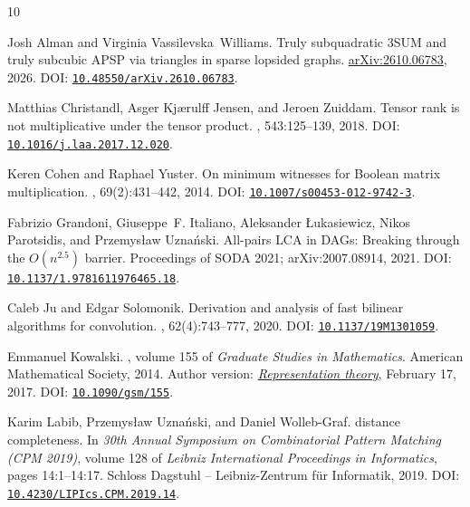 \documentclass[11pt]{article}
\newcommand{\doi}[1]{\href{https://doi.org/#1}{\nolinkurl{#1}}}
\begin{document}
\begin{thebibliography}{10}
\raggedright

Josh Alman and Virginia Vassilevska~Williams.
\newblock Truly subquadratic {3SUM} and truly subcubic {APSP} via triangles in
  sparse lopsided graphs.
\newblock \href{https://arxiv.org/abs/2610.06783}{arXiv:2610.06783}, 2026.
\newblock DOI: \doi{10.48550/arXiv.2610.06783}.

Matthias Christandl, Asger Kj{\ae}rulff Jensen, and Jeroen Zuiddam.
\newblock Tensor rank is not multiplicative under the tensor product.
, 543:125--139, 2018.
\newblock DOI: \doi{10.1016/j.laa.2017.12.020}.

Keren Cohen and Raphael Yuster.
\newblock On minimum witnesses for {Boolean} matrix multiplication.
, 69(2):431--442, 2014.
\newblock DOI: \doi{10.1007/s00453-012-9742-3}.

Fabrizio Grandoni, Giuseppe~F. Italiano, Aleksander {\L}ukasiewicz, Nikos
  Parotsidis, and Przemys{\l}aw Uzna\'{n}ski.
\newblock All-pairs {LCA} in {DAGs}: Breaking through the {$O(n^{2.5})$}
  barrier.
\newblock Proceedings of SODA 2021; arXiv:2007.08914, 2021.
\newblock DOI: \doi{10.1137/1.9781611976465.18}.

Caleb Ju and Edgar Solomonik.
\newblock Derivation and analysis of fast bilinear algorithms for convolution.
, 62(4):743--777, 2020.
\newblock DOI: \doi{10.1137/19M1301059}.

Emmanuel Kowalski.
, volume
  155 of {\em Graduate Studies in Mathematics}.
\newblock American Mathematical Society, 2014.
\newblock Author version:
  \href{https://people.math.ethz.ch/~kowalski/representation-theory.pdf}{\emph{Representation
  theory}}, February 17, 2017.
\newblock DOI: \doi{10.1090/gsm/155}.

Karim Labib, Przemys{\l}aw Uzna\'{n}ski, and Daniel Wolleb-Graf.
 distance completeness.
\newblock In {\em 30th Annual Symposium on Combinatorial Pattern Matching (CPM
  2019)}, volume 128 of {\em Leibniz International Proceedings in Informatics},
  pages 14:1--14:17. Schloss Dagstuhl -- Leibniz-Zentrum f{\"u}r Informatik,
  2019.
\newblock DOI: \doi{10.4230/LIPIcs.CPM.2019.14}.


\end{thebibliography}
\end{document}
